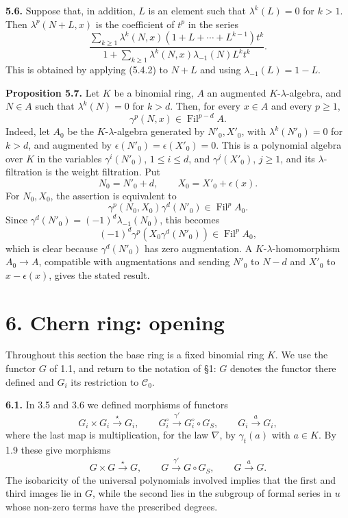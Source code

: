 \documentclass[11pt]{article}
\newcommand{\Fil}{\operatorname{Fil}}
\begin{document}
\textbf{5.6.} Suppose that, in addition, \(L\) is an element such that \(\lambda^k(L)=0\) for \(k>1\). Then \(\lambda^p(N+L,x)\) is the coefficient of \(t^p\) in the series
\begin{equation}\tag{5.6.1}
  \frac{\displaystyle\sum_{k\ge1}\lambda^k(N,x)
        (1+L+\cdots+L^{k-1})t^k}
       {\displaystyle 1+\sum_{k\ge1}\lambda^k(N,x)
        \lambda_{-1}(N)L^k t^k}.
\end{equation}
This is obtained by applying (5.4.2) to \(N+L\) and using \(\lambda_{-1}(L)=1-L\).

\textbf{Proposition 5.7.} Let \(K\) be a binomial ring, \(A\) an augmented \(K\)-\(\lambda\)-algebra, and \(N\in A\) such that \(\lambda^k(N)=0\) for \(k>d\). Then, for every \(x\in A\) and every \(p\ge1\),
\begin{equation}\tag{5.7.1}
  \gamma^p(N,x)\in\Fil^{p-d}A.
\end{equation}
Indeed, let \(A_0\) be the \(K\)-\(\lambda\)-algebra generated by \(N'_0,X'_0\), with \(\lambda^k(N'_0)=0\) for \(k>d\), and augmented by \(\epsilon(N'_0)=\epsilon(X'_0)=0\). This is a polynomial algebra over \(K\) in the variables \(\gamma^i(N'_0)\), \(1\le i\le d\), and \(\gamma^j(X'_0)\), \(j\ge1\), and its \(\lambda\)-filtration is the weight filtration. Put
\[
  N_0=N'_0+d,
  \qquad X_0=X'_0+\epsilon(x).
\]
For \(N_0,X_0\), the assertion is equivalent to
\[
  \gamma^p(N_0,X_0)\gamma^d(N'_0)\in\Fil^pA_0.
\]
Since \(\gamma^d(N'_0)=(-1)^d\lambda_{-1}(N_0)\), this becomes
\[
  (-1)^d\gamma^p(X_0\gamma^d(N'_0))\in\Fil^pA_0,
\]
which is clear because \(\gamma^d(N'_0)\) has zero augmentation. A \(K\)-\(\lambda\)-homomorphism \(A_0\to A\), compatible with augmentations and sending \(N'_0\) to \(N-d\) and \(X'_0\) to \(x-\epsilon(x)\), gives the stated result.

\section*{6. Chern ring: opening}

Throughout this section the base ring is a fixed binomial ring \(K\). We use the functor \(G\) of 1.1, and return to the notation of §1: \(G\) denotes the functor there defined and \(G_i\) its restriction to \(\mathscr C_0\).

\textbf{6.1.} In 3.5 and 3.6 we defined morphisms of functors
\[
  G_i\times G_i\xrightarrow{\star}G_i,
  \qquad
  G_i^\circ\xrightarrow{\gamma'}G_i^\circ\circ G_S,
  \qquad
  G_i\xrightarrow{a}G_i,
\]
where the last map is multiplication, for the law \(\nabla\), by \(\gamma_t(a)\) with \(a\in K\). By 1.9 these give morphisms
\[
  G\times G\xrightarrow{\star}G,
  \qquad
  G\xrightarrow{\gamma'}G\circ G_S,
  \qquad
  G\xrightarrow{a}G.
\]
The isobaricity of the universal polynomials involved implies that the first and third images lie in \(G\), while the second lies in the subgroup of formal series in \(u\) whose non-zero terms have the prescribed degrees.
\end{document}
